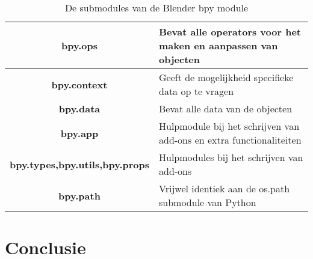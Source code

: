 \begin{table}[]
\begin{center}
\begin{tabular}{|c|l|}
\hline
\textbf{bpy.ops}                       & Bevat alle operators voor het maken en aanpassen van objecten       \\ \hline
\textbf{bpy.context}                   & Geeft de mogelijkheid specifieke data op te vragen                  \\ \hline
\textbf{bpy.data}                      & Bevat alle data van de objecten                                     \\ \hline
\textbf{bpy.app}                       & Hulpmodule bij het schrijven van add-ons en extra functionaliteiten \\ \hline
\textbf{bpy.types,bpy.utils,bpy.props} & Hulpmodules bij het schrijven van add-ons                           \\ \hline
\textbf{bpy.path}                      & Vrijwel identiek aan de os.path submodule van Python                \\ \hline
\end{tabular}
\caption{De submodules van de Blender bpy module \citep*{API1}}
\end{center}
\end{table}


\section{Conclusie}

